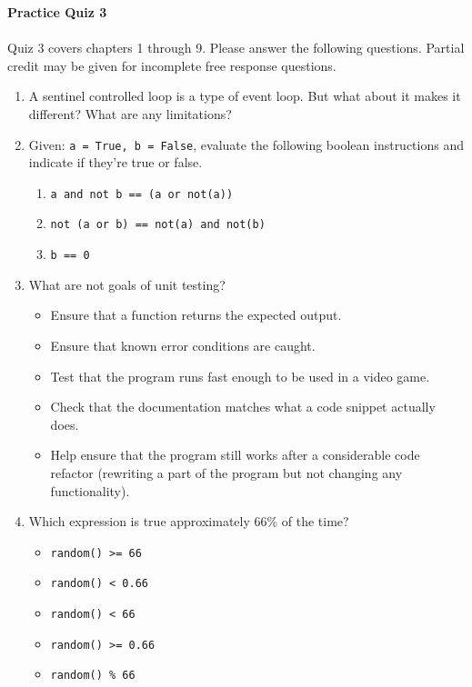 \documentclass[letter,10pt]{article}
\begin{document}
\huge
\textbf{Practice Quiz 3}
\normalsize

\paragraph{}Quiz 3 covers chapters 1 through 9. Please answer the following questions. Partial credit may be given for incomplete free response questions.

\begin{enumerate}
    \item A sentinel controlled loop is a type of event loop. But what about it makes it different? What are any limitations?

    \item Given: \verb|a = True, b = False|, evaluate the following boolean instructions and indicate if they're true or false.
    \begin{enumerate}
        \item \verb|a and not b == (a or not(a))|
        \item \verb|not (a or b) == not(a) and not(b)|
        \item \verb|b == 0|
    \end{enumerate}

    \item What are not goals of unit testing?
    \begin{itemize}
        \item Ensure that a function returns the expected output.
        \item Ensure that known error conditions are caught.
        \item Test that the program runs fast enough to be used in a video game.
        \item Check that the documentation matches what a code snippet actually does.
        \item Help ensure that the program still works after a considerable code refactor (rewriting a part of the program but not changing any functionality).
    \end{itemize}

    \item Which expression is true approximately 66\% of the time?
    \begin{itemize}
        \item \verb|random() >= 66|
        \item \verb|random() < 0.66|
        \item \verb|random() < 66|
        \item \verb|random() >= 0.66|
        \item \verb|random() % 66|
    \end{itemize}


\end{enumerate}
\end{document}
